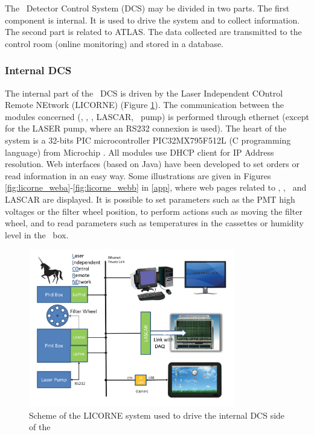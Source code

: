 The \las~Detector Control System (DCS) may be divided in two parts. The first component is internal. It is used to drive the system and to collect information. The second part is related to ATLAS. The data collected are transmitted to the control room (online monitoring) and stored in a database.

\subsubsection{Internal DCS}

The internal part of the \las~DCS is driven by the Laser Independent COntrol Remote NEtwork (LICORNE) (Figure \ref{fig:laslicorne}). The communication between the modules concerned (\licmot, \licphd, \licpmt, LASCAR, \laser~pump) is performed through ethernet (except for the LASER pump, where an RS232 connexion is used). The heart of the system is a 32-bits PIC microcontroller PIC32MX795F512L (C programming language) from Microchip \cite{ref:picmicro}. All modules use DHCP client for IP Address resolution. Web interfaces (based on Java) have been developed to set orders or read information in an easy way. Some illustrations are given in Figures \ref{fig:licorne_weba}-\ref{fig:licorne_webb} in \ref{app}, where web pages related to  \licmot, \licphd, \licpmt~and LASCAR are displayed. It is possible to set parameters such as the PMT high voltages or the filter wheel position, to perform actions such as moving the filter wheel, and to read parameters such as temperatures in the cassettes or humidity level in the \phocal~box.


\begin{figure}[htbp]
\centering
\includegraphics[width=9cm]{figures/licorne.pdf}
\caption{Scheme of the LICORNE system used to drive the internal DCS side of the \las}\label{fig:laslicorne}
\end{figure}

